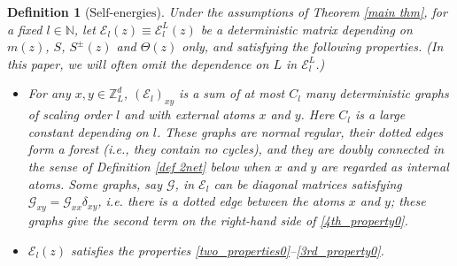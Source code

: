 \documentclass{article}
\newcommand{\1}{\mathds{1}}
\numberwithin{equation}{section}
\renewcommand{\cal}{\mathcal}
\newcommand{\N}{\mathbb{N}}
\newcommand{\Z}{\mathbb{Z}}
\newcommand{\Selfs}{\text{Self-energies}}
\DeclareMathOperator{\OO}{O}
\theoremstyle{plain} %
\newtheorem{definition}[theorem]{Definition}
\theoremstyle{remark}
\newcommand{\cor}{\color{red}}
\newcommand{\Sele}{{\mathcal E}}
\newcommand{\Selek}{{\mathcal E}}
\newcommand{\Cele}{{\mathscr E}}
\newcommand{\hty}[1]{{\cor (ht: #1) }}
\begin{document}
\begin{definition}[$\Selfs$]\label{collection elements}
Under the assumptions of Theorem \ref{main thm}, for a fixed $l\in \N$, let $\Sele_l(z)\equiv  \Selek_{l}^L(z)$ be a deterministic matrix depending on $m(z)$, $S$, $S^\pm(z)$ and $\Theta(z)$ only, and satisfying the following properties. (In this paper, we will often omit the dependence on $L$ in $\Selek_{l}^L$.)


 \begin{itemize}
\item[(i)] For any $x,y \in \Z_L^d$, $  (\Selek_{l})_{xy}$ is a sum of at most $C_l$ many deterministic graphs of scaling order $l$ and with external atoms $x$ and $y$. Here $C_l$ is a large constant depending on $l$. These graphs are normal regular, their dotted edges form a forest (i.e., they contain no cycles), and they are doubly connected in the sense of Definition \ref{def 2net} below when $x$ and $y$ are regarded as internal atoms. Some graphs, say $\cal G$, in $\Sele_l$ can be diagonal matrices satisfying $  \cal G_{xy}= \cal G_{xx} \delta_{xy}$, i.e. there is a dotted edge between the atoms $x$ and $y$; these graphs give the second term on the right-hand side of \eqref{4th_property0}. %

\item[(ii)] $ \Selek_{l} (z)$ satisfies the properties \eqref{two_properties0}--\eqref{3rd_property0}.



\end{itemize}
\end{definition}
\end{document}
